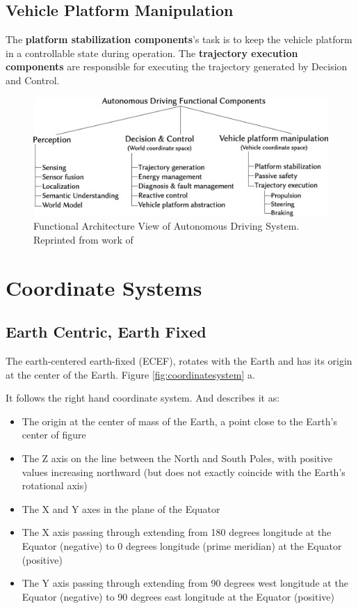\subsection{Vehicle Platform Manipulation}

The \textbf{platform stabilization components}'s task is to keep the vehicle platform in a controllable state during operation. The \textbf{trajectory execution components} are responsible for executing the trajectory generated by Decision and Control. 

\begin{figure}
	\centering
	\includegraphics[width=5in]{figures/fav_autonomous_driving}
	\caption[FAV of Antonomous Driving System.]{\small 
		Functional Architecture View of Autonomous Driving System. Reprinted from work of  }
	\label{fig:fav_automonous}
\end{figure}

\section{Coordinate Systems}
	
\subsection{Earth Centric, Earth Fixed}

The earth-centered earth-fixed (ECEF), rotates with the Earth and has its origin at the center of the Earth. Figure \ref{fig:coordinatesystem} a.

It follows the right hand coordinate system. And  describes it as:

\begin{itemize}
	\item The origin at the center of mass of the Earth, a point close to the Earth's center of figure
	\item The Z axis on the line between the North and South Poles, with positive values increasing northward (but does not exactly coincide with the Earth's rotational axis)
	\item The X and Y axes in the plane of the Equator
	\item The X axis passing through extending from 180 degrees longitude at the Equator (negative) to 0 degrees longitude (prime meridian) at the Equator (positive)
	\item The Y axis passing through extending from 90 degrees west longitude at the Equator (negative) to 90 degrees east longitude at the Equator (positive)
\end{itemize}

